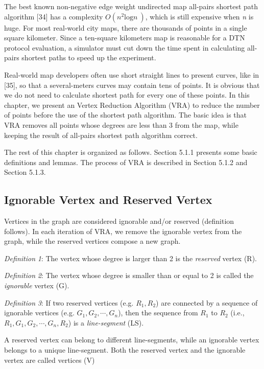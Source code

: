 The best known non-negative edge weight undirected map all-pairs shortest path algorithm [34] has a complexity $O\left(n^2{\mathrm{log} n\ }\right)$, which is still expensive when \textit{n} is huge. For most real-world city maps, there are thousands of points in a single square kilometer. Since a ten-square kilometers map is reasonable for a DTN protocol evaluation, a simulator must cut down the time spent in calculating all-pairs shortest paths to speed up the experiment.

Real-world map developers often use short straight lines to present curves, like in [35], so that a several-meters curves may contain tens of points. It is obvious that we do not need to calculate shortest path for every one of these points. In this chapter, we present an Vertex Reduction Algorithm (VRA) to reduce the number of points before the use of the shortest path algorithm. The basic idea is that VRA removes all points whose degrees are less than 3 from the map, while keeping the result of all-pairs shortest path algorithm correct.

The rest of this chapter is organized as follows. Section 5.1.1 presents some basic definitions and lemmas. The process of VRA is described in Section 5.1.2 and Section 5.1.3.



\subsection{ Ignorable Vertex and Reserved Vertex}

\noindent Vertices in the graph are considered ignorable and/or reserved (definition follows). In each iteration of VRA, we remove the ignorable vertex from the graph, while the reserved vertices compose a new graph.

\textit{Definition} \textit{1}: The vertex whose degree is larger than 2 is the \textit{reserved} vertex (R).

\textit{Definition} \textit{2}: The vertex whose degree is smaller than or equal to 2 is called the \textit{ignorable} vertex (G).

\noindent \textit{Definition} \textit{3}: If two reserved vertices (e.g. $R_1,R_2$) are connected by a sequence of ignorable vertices (e.g. $G_1,G_2,\mathrm{\cdots },G_n$), then the sequence from $R_1$ to $R_2$ (i.e., $R_1,G_1,G_2,\mathrm{\cdots },G_n,R_2$) is a \textit{line-segment} (LS). 

\noindent A reserved vertex can belong to different line-segments, while an ignorable vertex belongs to a unique line-segment. Both the reserved vertex and the ignorable vertex are called vertices (V)\textit{}

